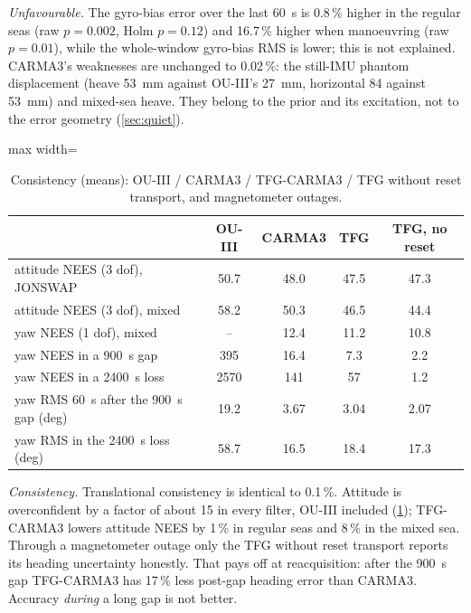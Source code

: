 \documentclass[conference]{IEEEtran}
\theoremstyle{bodysmall}
\begin{document}
\emph{Unfavourable.} The gyro-bias error over the last \SI{60}{s} is 0.8\,\%
higher in the regular seas (raw $p=0.002$, Holm $p=0.12$) and 16.7\,\% higher
when manoeuvring (raw $p=0.01$), while the whole-window gyro-bias RMS is
lower; this is not explained. CARMA3's weaknesses are unchanged to
0.02\,\%: the still-IMU phantom displacement (heave \SI{53}{mm} against
OU-III's \SI{27}{mm}, horizontal 84 against \SI{53}{mm}) and mixed-sea heave.
They belong to the prior and its excitation, not to the error geometry
(\cref{sec:quiet}).

\begin{table}[t]
  \centering
  \caption{Consistency (means): OU-III / CARMA3 / TFG-CARMA3 / TFG without
    reset transport, and magnetometer outages.}
  \label{tab:consistency}
  \footnotesize
  \setlength{\tabcolsep}{2.5pt}
  \begin{adjustbox}{max width=\columnwidth}
  \begin{tabular}{@{}lcccc@{}}
    \toprule
    & OU-III & CARMA3 & TFG & TFG, no reset\\
    \midrule
    attitude NEES (3 dof), JONSWAP & 50.7 & 48.0 & 47.5 & 47.3\\
    attitude NEES (3 dof), mixed & 58.2 & 50.3 & 46.5 & 44.4\\
    yaw NEES (1 dof), mixed & -- & 12.4 & 11.2 & 10.8\\
    yaw NEES in a \SI{900}{s} gap & 395 & 16.4 & 7.3 & 2.2\\
    yaw NEES in a \SI{2400}{s} loss & 2570 & 141 & 57 & 1.2\\
    yaw RMS \SI{60}{s} after the \SI{900}{s} gap (deg) & 19.2 & 3.67 & 3.04 & 2.07\\
    yaw RMS in the \SI{2400}{s} loss (deg) & 58.7 & 16.5 & 18.4 & 17.3\\
    \bottomrule
  \end{tabular}
  \end{adjustbox}
\end{table}

\emph{Consistency.} Translational consistency is identical to 0.1\,\%.
Attitude is overconfident by a factor of about 15 in every filter, OU-III
included (\cref{tab:consistency}); TFG-CARMA3 lowers attitude NEES by 1\,\%
in regular seas and 8\,\% in the mixed sea. Through a magnetometer outage only
the TFG without reset transport reports its heading uncertainty honestly. That
pays off at reacquisition: after the \SI{900}{s} gap TFG-CARMA3 has 17\,\%
less post-gap heading error than CARMA3. Accuracy \emph{during} a long gap is
not better.
\end{document}
